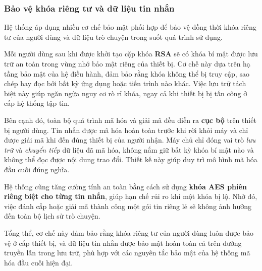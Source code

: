 \subsubsection{Bảo vệ khóa riêng tư và dữ liệu tin nhắn}
\indent Hệ thống áp dụng nhiều cơ chế bảo mật phối hợp để bảo vệ đồng thời khóa riêng tư của người dùng và dữ liệu trò chuyện trong suốt quá trình sử dụng.

\indent Mỗi người dùng sau khi được khởi tạo cặp khóa \textbf{RSA} sẽ có khóa bí mật được lưu trữ an toàn trong vùng nhớ bảo mật riêng của thiết bị.  
Cơ chế này dựa trên hạ tầng bảo mật của hệ điều hành, đảm bảo rằng khóa không thể bị truy cập, sao chép hay đọc bởi bất kỳ ứng dụng hoặc tiến trình nào khác.  
Việc lưu trữ tách biệt này giúp ngăn ngừa nguy cơ rò rỉ khóa, ngay cả khi thiết bị bị tấn công ở cấp hệ thống tập tin.

\indent Bên cạnh đó, toàn bộ quá trình mã hóa và giải mã đều diễn ra \textbf{cục bộ} trên thiết bị người dùng.  
Tin nhắn được mã hóa hoàn toàn trước khi rời khỏi máy và chỉ được giải mã khi đến đúng thiết bị của người nhận.  
Máy chủ chỉ đóng vai trò \textit{lưu trữ} và \textit{chuyển tiếp} dữ liệu đã mã hóa, không nắm giữ bất kỳ khóa bí mật nào và không thể đọc được nội dung trao đổi.  
Thiết kế này giúp duy trì mô hình mã hóa đầu cuối đúng nghĩa.

\indent Hệ thống cũng tăng cường tính an toàn bằng cách sử dụng \textbf{khóa AES phiên riêng biệt cho từng tin nhắn}, giúp hạn chế rủi ro khi một khóa bị lộ.  
Nhờ đó, việc đánh cắp hoặc giải mã thành công một gói tin riêng lẻ sẽ không ảnh hưởng đến toàn bộ lịch sử trò chuyện.

\indent Tổng thể, cơ chế này đảm bảo rằng khóa riêng tư của người dùng luôn được bảo vệ ở cấp thiết bị, và dữ liệu tin nhắn được bảo mật hoàn toàn cả trên đường truyền lẫn trong lưu trữ, phù hợp với các nguyên tắc bảo mật của hệ thống mã hóa đầu cuối hiện đại.
